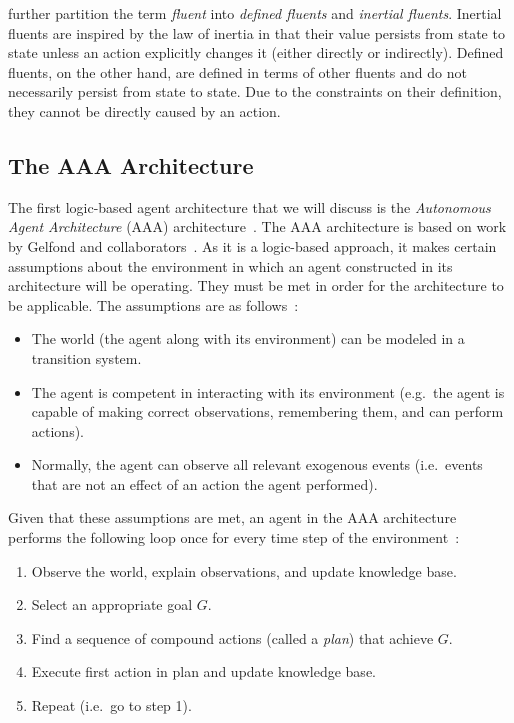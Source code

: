 \citet{gelfond_knowledge_2014} further partition the term \textit{fluent} into \textit{defined fluents} and \textit{inertial fluents}.
Inertial fluents are inspired by the law of inertia in that their value persists from state to state unless an action explicitly changes it (either directly or indirectly).
Defined fluents, on the other hand, are defined in terms of other fluents and do not necessarily persist from state to state.
Due to the constraints on their definition, they cannot be directly caused by an action.


\subsection{The AAA Architecture}
\label{subsec:aaa_architecture}

The first logic-based agent architecture that we will discuss is the \textit{Autonomous Agent Architecture} (AAA) architecture~\citep{balduccini_aaa_2008}.
The AAA architecture is based on work by Gelfond and collaborators~\citep{baral_reasoning_2000,balduccini_diagnostic_2003, balduccini_answer_2006,balduccini_learning_2007}.
As it is a logic-based approach, it makes certain assumptions about the environment in which an agent constructed in its architecture will be operating.
They must be met in order for the architecture to be applicable.
The assumptions are as follows~\citep{balduccini_aaa_2008}:

\begin{itemize}
    \item The world (the agent along with its environment) can be modeled in a transition system.
    \item The agent is competent in interacting with its environment (e.g.~the agent is capable of making correct observations, remembering them, and can perform actions).
    \item Normally, the agent can observe all relevant exogenous events (i.e.~events that are not an effect of an action the agent performed).
\end{itemize}

Given that these assumptions are met, an agent in the AAA architecture performs the following loop once for every time step of the environment~\citep{balduccini_aaa_2008}:

\begin{enumerate}
    \item Observe the world, explain observations, and update knowledge base.
    \item Select an appropriate goal $G$.
    \item Find a sequence of compound actions (called a \textit{plan}) that achieve $G$.
    \item Execute first action in plan and update knowledge base.
    \item Repeat (i.e.~go to step 1).
\end{enumerate}

